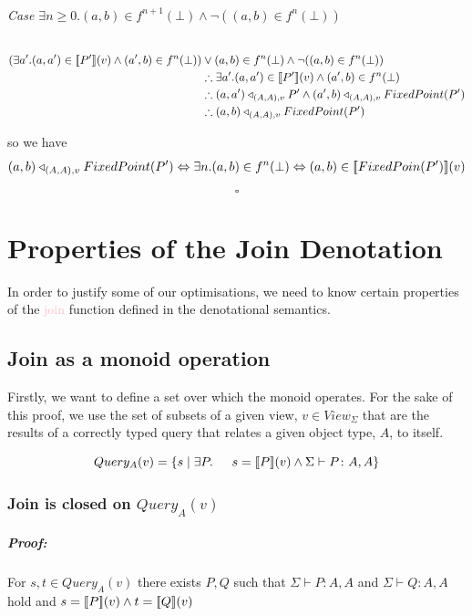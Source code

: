 \documentclass[12pt,a4paper,twoside,openright]{report}
\newcommand\mathName[1]{\textcolor{pink}{#1}}
\newcommand{\db}[1]{{\bf [\![}#1{\bf ]\!]}}
\newcommand{\deno}[1]{\db{#1}(v)}
\newcommand{\setComp}[2]{\left\lbrace #1 \mid #2 \right\rbrace}
\newcommand{\typeRule}[2]{\Sigma\vdash #1 \colon #2}
\newcommand{\denoRule}[2]{#1 \in \deno{#2}}
\newcommand{\opRule}[3]{#1 \triangleleft_{#2, v} #3}
\newcommand{\queryT}[1]{Query_{#1}(v)}
\begin{document}
\subparagraph{Case $\exists n \geq 0. (a, b) \in f^{n+1}(\bot) \wedge \neg ((a, b) \in f^n(\bot))$}
\begin{equation}
\label{Case n+1}
\begin{split}
(\exists a'. \denoRule{(a, a')}{P'} \wedge (a', b) \in f^{n}(\bot)) & \vee (a, b) \in f^{n}(\bot) \wedge \neg ((a, b) \in f^n(\bot))\\
&\therefore \exists a'. \denoRule{(a, a')}{P'} \wedge (a', b) \in f^{n}(\bot)\\
&\therefore \opRule{(a, a')}{(A, A)}{P'} \wedge \opRule{(a', b)}{(A, A)}{FixedPoint(P')}\\
&\therefore \opRule{(a,b)}{(A,A)}{FixedPoint(P')}
\end{split}
\end{equation}

so we have \[\opRule{(a, b)}{(A, A)}{FixedPoint(P')} \Leftrightarrow \exists n. (a, b) \in f^n(\bot) \Leftrightarrow \denoRule{(a, b)}{FixedPoin(P')}\]

$$\square$$

\chapter{Properties of the Join Denotation}
\label{MonoidJoins}

In order to justify some of our optimisations, we need to know certain properties of the \mathName{join} function defined in the denotational semantics. 

\section{Join as a monoid operation}
Firstly, we want to define a set over which the monoid operates. For the sake of this proof, we use the set of subsets of a given view, $v \in View_{\Sigma}$ that are the results of a correctly typed query that relates a given object type, $A$, to itself.

\begin{equation}
	\queryT{A} = \setComp{s}{\exists P.\indent s = \deno{P} \wedge \typeRule{P}{A, A}}
\end{equation}

\subsection{Join is closed on $\queryT{A}$}
\paragraph{Proof:}For $s, t \in \queryT{A}$ there exists $P, Q$ such that $\typeRule{P}{A, A}$ and $\typeRule{Q}{A, A}$ hold and $s = \deno{P} \wedge t = \deno{Q}$
\end{document}

